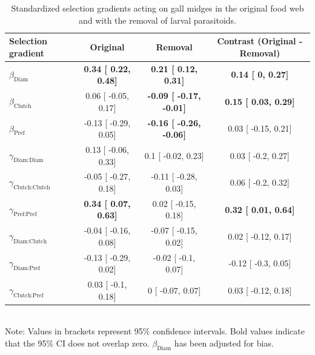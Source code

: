\documentclass[11pt,]{article}
\begin{document}
\begin{table}[h]
\caption{Standardized selection gradients acting on gall midges in the original food web and with the removal of larval parasitoids.}
\label{Table:Gradients}
\centering
\begin{tabular}{lccc}
\\ 
\hline
\textbf{Selection gradient} & \textbf{Original} & \textbf{Removal} & \textbf{Contrast} (\small{Original - Removal}) \\
\hline
$\beta_{\text{Diam}}$ & 
\textbf{
0.34 [
0.22,
0.48] } & 
\textbf{
0.21 [
0.12,
0.31] } & 
\textbf{
0.14 [
0,
0.27] }\\

$\beta_{\text{Clutch}}$ & 
0.06 [
-0.05,
0.17] & 
\textbf{
-0.09 [
-0.17,
-0.01] } & 
\textbf{
0.15 [
0.03,
0.29] }\\

$\beta_{\text{Pref}}$ &
-0.13 [
-0.29,
0.05] & 
\textbf{
-0.16 [
-0.26,
-0.06] } & 

0.03 [
-0.15,
0.21] \\

$\gamma_{\text{Diam:Diam}}$ &
0.13 [
-0.06,
0.33] & 

0.1 [
-0.02,
0.23] & 

0.03 [
-0.2,
0.27] \\

$\gamma_{\text{Clutch:Clutch}}$ & 
-0.05 [
-0.27,
0.18] & 

-0.11 [
-0.28,
0.03] & 

0.06 [
-0.2,
0.32] \\

$\gamma_{\text{Pref:Pref}}$ & 
\textbf{
0.34 [
0.07,
0.63] }& 

0.02 [
-0.15,
0.18] & 
\textbf{
0.32 [
0.01,
0.64] }\\

$\gamma_{\text{Diam:Clutch}}$ & 
-0.04 [
-0.16,
0.08] & 

-0.07 [
-0.15,
0.02] & 

0.02 [
-0.12,
0.17] \\

$\gamma_{\text{Diam:Pref}}$ & 
-0.13 [
-0.29,
0.02] & 

-0.02 [
-0.1,
0.07] & 

-0.12 [
-0.3,
0.05] \\

$\gamma_{\text{Clutch:Pref}}$ & 
0.03 [
-0.1,
0.18] & 

0 [
-0.07,
0.07] & 

0.03 [
-0.12,
0.18] \\ 
\hline
\end{tabular}
\bigskip{}
\\
{\footnotesize Note: Values in brackets represent 95\% confidence intervals. Bold values indicate that the 95\% CI does not overlap zero. $\beta_{\text{Diam}}$ has been adjusted for bias.}
\end{table}
\end{document}
